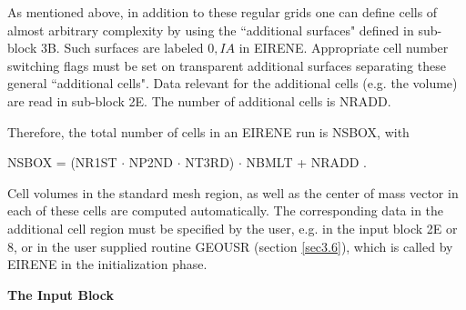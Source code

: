 As mentioned above,
in addition to these regular grids one can define cells of almost
arbitrary complexity by using the ``additional surfaces" defined in
sub-block 3B. Such surfaces are labeled $0,IA$  in EIRENE.
Appropriate cell number switching flags must be set
on transparent additional
surfaces separating these general ``additional cells".
Data relevant for the
additional cells (e.g. the volume)
are read in sub-block 2E. The number of additional cells
is NRADD.

Therefore, the total number of cells in an EIRENE run is NSBOX, with

NSBOX = (NR1ST $\cdot$ NP2ND $\cdot$ NT3RD) $\cdot$ NBMLT + NRADD .

Cell volumes in the standard mesh region, as well as the center of
mass vector in each of these cells are computed automatically. The
corresponding data in the additional cell region must be specified
by the user, e.g. in the input block 2E or 8, or in the user
supplied routine GEOUSR (section \ref{sec3.6}), which is called by
EIRENE in the initialization phase.

\medskip

\noindent

{\bf The Input Block}

\medskip

\noindent

